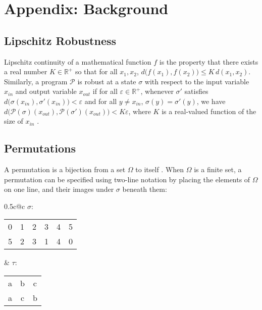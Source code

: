 \documentclass{llncs}
\begin{document}
\appendix

\vspace{-0.1in}
\section{Appendix: Background}

  \subsection{Lipschitz Robustness}

    Lipschitz continuity of a mathematical function \(f\) is the property that there
    exists a real number \(K \in \mathbb{R}^{+}\) so that for all \(x_{1}, x_{2}\),
    \(d\big(f(x_{1}), f(x_{2})\big) \leq K\,d(x_{1}, x_{2})\).  Similarly, a program
    \(\mathcal{P}\) is robust at a state \(\sigma\)  with respect to the input
    variable \(x_{in}\) and output variable \(x_{out}\) if for all \(\varepsilon \in
    \mathbb{R}^{+}\), whenever \(\sigma'\) satisfies
    \(d\big(\sigma(x_{in}), \sigma'(x_{in})\big) < \varepsilon\) and
    for all \(y \not= x_{in}\), \(\sigma(y) = \sigma'(y)\),
    we have \(d\big(\mathcal{P}(\sigma)(x_{out}), \mathcal{P}(\sigma')(x_{out})\big) < K\varepsilon\),
    where \(K\) is a real-valued function of the size of \(x_{in}\)
    \cite{chaudhuri11}.

    \vspace{-0.1in}
  \subsection{Permutations}
  \label{perms}

    A permutation is a bijection from a set \(\Omega\) to itself \cite{dummitfoote}.
    When \(\Omega\) is a finite set, a permutation can be specified using two-line
    notation by placing the elements of \(\Omega\) on one line, and their images
    under \(\sigma\) beneath them:

    \begin{center}
    \begin{tabular*}{0.5\textwidth}{c@{\extracolsep{\fill}}c}
    \(\sigma\):
    \begin{tabular}{c@{\hspace{1em}}c@{\hspace{1em}}c@{\hspace{1em}}c@{\hspace{1em}}c@{\hspace{1em}}c}
    0 & 1 & 2 & 3 & 4 & 5\\
    5 & 2 & 3 & 1 & 4 & 0
    \end{tabular}
    &
    \(\tau\):
    \begin{tabular}{c@{\hspace{1em}}c@{\hspace{1em}}c}
    a & b & c\\
    a & c & b
    \end{tabular}
    \end{tabular*}
    \end{center}
\end{document}
